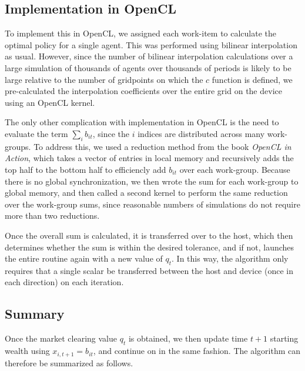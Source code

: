 \documentclass[a4paper,12pt]{article}
\numberwithin{equation}{section}
\theoremstyle{definition}
\begin{document}
\subsection{Implementation in OpenCL}

To implement this in OpenCL, we assigned each work-item to calculate
the optimal policy for a single agent. This was performed using
bilinear interpolation as usual. However, since the number of bilinear
interpolation calculations over a large simulation of thousands of
agents over thousands of periods is likely to be large relative to the
number of gridpoints on which the $c$ function is defined, we
pre-calculated the interpolation coefficients over the entire grid on
the device using an OpenCL kernel.

The only other complication with implementation in OpenCL is the need
to evaluate the term $\sum_i b_{it}$, since the $i$ indices are
distributed across many work-groups. To address this, we used a
reduction method from the book \emph{OpenCL in Action}, which takes a
vector of entries in local memory and recursively adds the top half to
the bottom half to efficiencly add $b_{it}$ over each
work-group. Because there is no global synchronization, we then wrote
the sum for each work-group to global memory, and then called a second
kernel to perform the same reduction over the work-group sums, since
reasonable numbers of simulations do not require more than two
reductions.

Once the overall sum is calculated, it is transferred over to the
host, which then determines whether the sum is within the desired
tolerance, and if not, launches the entire routine again with a new
value of $q_t$. In this way, the algorithm only requires that a single
scalar be transferred between the host and device (once in each
direction) on each iteration.

\subsection{Summary}

Once the market clearing value $q_t$ is obtained, we then update time
$t+1$ starting wealth using $x_{i,t+1} = b_{it}$, and continue on in
the same fashion. The algorithm can therefore be summarized as follows.
\end{document}
